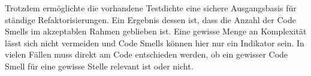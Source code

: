 Trotzdem ermöglichte die vorhandene Testdichte eine sichere Ausgangsbasis für ständige Refaktorisierungen. Ein Ergebnis dessen ist, dass die Anzahl der Code Smells im akzeptablen Rahmen geblieben ist. Eine gewisse Menge an Komplexität lässt sich nicht vermeiden und Code Smells können hier nur ein Indikator sein. In vielen Fällen muss direkt am Code entschieden werden, ob ein gewisser Code Smell für eine gewisse Stelle relevant ist oder nicht.
